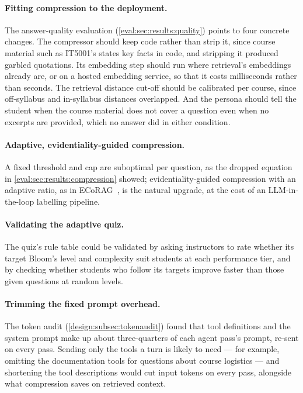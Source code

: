 \paragraph{Fitting compression to the deployment.} The answer-quality
evaluation (\autoref{eval:sec:results:quality}) points to four concrete
changes. The compressor should keep code rather than strip it, since course
material such as IT5001's states key facts in code, and stripping it
produced garbled quotations. Its embedding step should run where retrieval's
embeddings already are, or on a hosted embedding service, so that it costs
milliseconds rather than seconds. The retrieval distance cut-off should be
calibrated per course, since off-syllabus and in-syllabus distances
overlapped. And the persona should tell the student when the course material
does not cover a question even when no excerpts are provided, which no answer
did in either condition.

\paragraph{Adaptive, evidentiality-guided compression.} A fixed threshold
and cap are suboptimal per question, as the dropped equation in
\autoref{eval:sec:results:compression} showed; evidentiality-guided
compression with an adaptive ratio, as in ECoRAG~\cite{facl25:Jeong}, is the
natural upgrade, at the cost of an LLM-in-the-loop labelling pipeline.

\paragraph{Validating the adaptive quiz.} The quiz's rule table could be
validated by asking instructors to rate whether its target Bloom's level and
complexity suit students at each performance tier, and by checking whether
students who follow its targets improve faster than those given questions at
random levels.

\paragraph{Trimming the fixed prompt overhead.} The token audit
(\autoref{design:subsec:tokenaudit}) found that tool definitions and the
system prompt make up about three-quarters of each agent pass's prompt,
re-sent on every pass. Sending only the tools a turn is likely to need ---
for example, omitting the documentation tools for questions about course
logistics --- and shortening the tool descriptions would cut input tokens on
every pass, alongside what compression saves on retrieved context.

